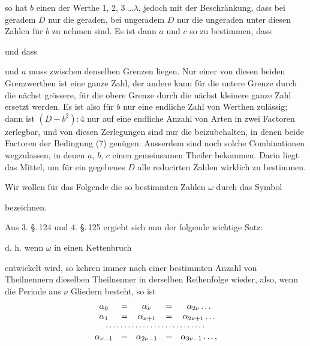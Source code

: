 
so hat $b$ einen der Werthe 1, 2, 3 \ldots $\lambda$, jedoch mit der Beschränkung, dass bei geradem $D$ nur die geraden, bei ungeradem $D$ nur die ungeraden unter diesen Zahlen für $b$ zu nehmen sind. Es ist dann $a$ und $c$ so zu bestimmen, dass


und dass


und $a$ muss zwischen denselben Grenzen liegen. Nur einer von diesen beiden Grenzwerthen ist eine ganze Zahl, der andere kann für die untere Grenze durch die nächst grössere, für die obere Grenze durch die nächst kleinere ganze Zahl ersetzt werden. Es ist also für $b$ nur eine endliche Zahl von Werthen zulässig; dann ist $(D-b^2):4$ nur auf eine endliche Anzahl von Arten in zwei Factoren zerlegbar, und von diesen Zerlegungen sind nur die beizubehalten, in denen beide Factoren der Bedingung (7) genügen. Ausserdem sind noch solche Combinationen wegzulassen, in denen $a$, $b$, $c$ einen gemeinsamen Theiler bekommen. Darin liegt das Mittel, um für ein gegebenes $D$ alle reducirten Zahlen wirklich zu bestimmen.

Wir wollen für das Folgende die so bestimmten Zahlen $\omega$ durch das Symbol


bezeichnen.

Aus 3. \S.\,124 und 4. \S.\,125 ergiebt sich nun der folgende wichtige Satz:


d. h. wenn $\omega$ in einen Kettenbruch


entwickelt wird, so kehren immer nach einer bestimmten Anzahl von Theilnennern dieselben Theilnenner in derselben Reihenfolge wieder, also, wenn die Periode aus $\nu$ Gliedern besteht, so ist
\[
\begin{array}{ccccc}
\alpha_0 &=& \alpha_\nu &=& \alpha_{2\nu} \ldots\\
\alpha_1 &=& \alpha_{\nu+1} &=& \alpha_{2\nu+1} \ldots\\
\multicolumn{5}{c}{\cdots\cdots\cdots\cdots\cdots\cdots\cdots\cdots\cdots}\\
\alpha_{\nu-1} &=& \alpha_{2\nu-1} &=& \alpha_{3\nu-1} \ldots,
\end{array}
\]
